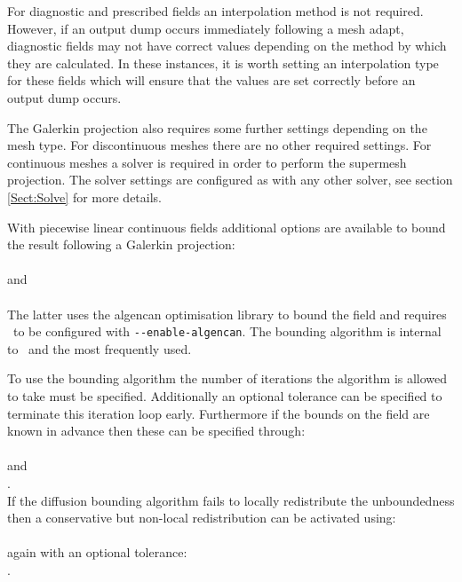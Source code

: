 For diagnostic and prescribed fields an interpolation method is not required. However, if an output dump
occurs immediately following a mesh adapt, diagnostic fields may not have correct values depending
on the method by which they are calculated. In these instances, it is worth setting an interpolation type
for these fields which will ensure that the values are set correctly before an output dump occurs.

The Galerkin projection also requires some further settings depending on the mesh type. For discontinuous
meshes there are no other required settings.  For continuous meshes a solver is required in order
to perform the supermesh projection. The solver settings are configured as with any other solver, see
section \ref{Sect:Solve} for more details.

With piecewise linear continuous fields additional options are available to bound the result following a Galerkin projection:\\
\\
and\\
\\
The latter uses the algencan optimisation library to bound the field and requires \fluidity\ to be configured with \lstinline[language=bash]+--enable-algencan+.  The  bounding algorithm is internal to \fluidity\ and the most frequently used.

To use the  bounding algorithm \citep{farrell2009a} the number of iterations the algorithm is allowed to take must be specified.  Additionally an optional tolerance can be specified to terminate this iteration loop early.  Furthermore if the bounds on the field are known in advance then these can be specified through:\\
\\
and\\
.\\
If the diffusion bounding algorithm fails to locally redistribute the unboundedness then a conservative but non-local redistribution can be activated using:\\
\\
again with an optional tolerance:\\
.

